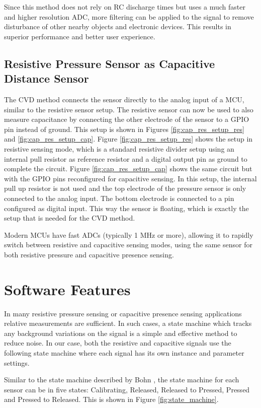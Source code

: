 \documentclass{sigchi-ext}
\begin{document}
Since this method does not rely on RC discharge times but uses 
a much faster and higher resolution ADC, more filtering can be applied to the signal to remove
disturbance of other nearby objects and electronic devices. This results in
superior performance and better user experience.

\subsection{Resistive Pressure Sensor as Capacitive Distance Sensor}
The CVD method connects the sensor directly to the analog input of a
MCU, similar to the resistive sensor setup. The resistive sensor can
now be used to also measure capacitance by connecting the other electrode of the
sensor to a GPIO pin instead of ground. This setup is shown in Figures
\ref{fig:cap_res_setup_res} and \ref{fig:cap_res_setup_cap}. Figure \ref{fig:cap_res_setup_res} shows the setup in resistive sensing mode,
which is a standard resistive divider setup using an internal pull resistor
as reference resistor and a digital output pin as ground to complete the
circuit. Figure \ref{fig:cap_res_setup_cap} shows the same circuit but with the GPIO pins
reconfigured for capacitive sensing. In this setup, the internal pull up
resistor is not used and the top electrode of the pressure sensor is only
connected to the analog input. The bottom electrode is connected to a pin 
configured as digital input. This way the sensor is
floating, which is exactly the setup that is needed for the CVD method.

Modern MCUs have fast ADCs (typically 1 MHz or more), allowing it to rapidly switch between
resistive and capacitive sensing modes, using the same sensor for both
resistive pressure and capacitive presence sensing.

\section{Software Features}
In many resistive pressure sensing or capacitive presence sensing applications relative measurements are sufficient. In such cases, a state machine which tracks any background variations on the signal is a simple and effective method to reduce noise. In our case, both the resistive and capacitive signals use the following state machine where each signal has its own instance and parameter settings. 

Similar to the state machine described by Bohn \cite{Bohn2009}, the state
machine for each sensor can be in five states: Calibrating, Released, Released
to Pressed, Pressed and Pressed to Released. This is shown in Figure
\ref{fig:state_machine}.
\end{document}
